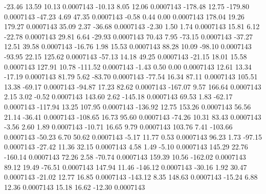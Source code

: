       -23.46       13.59       10.13     0.0007143
      -10.13        8.05       12.06     0.0007143
     -178.48       12.75     -179.80     0.0007143
      -47.23        4.69       47.35     0.0007143
       -0.58        0.44        0.00     0.0007143
      178.04       19.26      179.27     0.0007143
       35.09        2.37      -36.68     0.0007143
       -2.30        1.50        1.74     0.0007143
       15.81        6.12      -22.78     0.0007143
       29.81        6.64      -29.93     0.0007143
       70.43        7.95      -73.15     0.0007143
      -37.27       12.51       39.58     0.0007143
      -16.76        1.98       15.53     0.0007143
       88.28       10.09      -98.10     0.0007143
      -93.95       22.15      125.62     0.0007143
      -57.13       14.18       49.25     0.0007143
      -21.15       18.01       15.58     0.0007143
      127.91       10.78     -111.52     0.0007143
       -1.43        0.50        0.00     0.0007143
       12.61       13.34      -17.19     0.0007143
       81.79        5.62      -83.70     0.0007143
      -77.54       16.34       87.11     0.0007143
      105.51       13.38      -69.17     0.0007143
      -94.87       17.23       82.62     0.0007143
     -167.07        9.57      166.64     0.0007143
        2.15        3.02       -0.52     0.0007143
      143.60        2.62     -145.18     0.0007143
       69.53        1.83      -62.17     0.0007143
     -117.94       13.25      107.95     0.0007143
     -136.92       12.75      153.26     0.0007143
       56.56       21.14      -36.41     0.0007143
     -108.65       16.73       95.60     0.0007143
      -74.26       10.31       83.43     0.0007143
       -3.56        2.60        1.89     0.0007143
      -10.71       16.65        9.79     0.0007143
      103.76        7.41     -103.66     0.0007143
      -50.23        6.70       50.62     0.0007143
       -5.17       11.77        0.53     0.0007143
       96.23        1.73      -97.15     0.0007143
      -27.42       11.36       32.15     0.0007143
        4.58        1.49       -5.10     0.0007143
      145.29       22.76     -160.14     0.0007143
       72.26        2.58      -70.74     0.0007143
      159.39       10.56     -162.02     0.0007143
       89.12       19.49      -76.51     0.0007143
      147.94       11.46     -146.12     0.0007143
      -30.16        1.92       30.47     0.0007143
      -21.02       12.77       16.85     0.0007143
     -143.12        8.35      148.63     0.0007143
      -15.24        6.88       12.36     0.0007143
       15.18       16.62      -12.30     0.0007143
